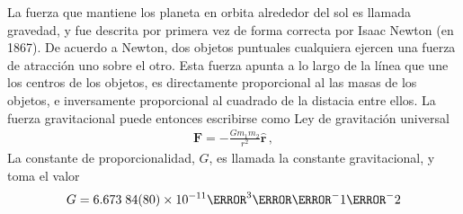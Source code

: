 \begin{frame}
La fuerza que mantiene los planeta en orbita alrededor del sol es llamada gravedad, y fue descrita por primera vez de forma correcta por Isaac Newton (en 1867). De acuerdo a Newton, dos objetos puntuales cualquiera ejercen una fuerza de atracción uno sobre el otro. Esta fuerza apunta a lo largo de la línea que une los centros de los objetos, es directamente proporcional al las masas de los objetos, e inversamente proporcional al cuadrado de la distacia entre ellos. La fuerza gravitacional puede entonces escribirse como 
Ley de gravitación universal
\begin{align}
  \label{eq:gravu}
  \mathbf{F}=-\frac{Gm_1m_2}{r^2}\hat{\mathbf{r}}\,,
\end{align}
La constante de proporcionalidad, $G$, es llamada la constante gravitacional, y toma el valor
\begin{equation}
  G=6.673\;84(80)\times 10^{-11}\meter^3\kilo\gram^-1\second^-2
\end{equation}
\end{frame}



